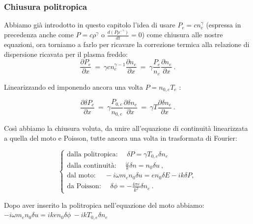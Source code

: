 %
%
\subsubsection{Chiusura politropica} 
Abbiamo già introdotto in questo capitolo l'idea di usare $P_e=cn_e^\gamma$ (espressa in precedenza anche come $P=c\rho^\gamma$ o $\frac{d(P\rho^{-\gamma})}{dt}=0$) come chiusura alle nostre equazioni, ora torniamo a farlo per ricavare la correzione termica alla relazione di dispersione ricavata per il plasma freddo:
\[\frac{\partial P_e}{\partial x}\ =\ \gamma cn_e^{\gamma-1}\frac{\partial n_e}{\partial x}\ =\ \gamma \frac{P_e}{n_e}\frac{\partial n_e}{\partial x}\ .\] 

Linearizzando ed imponendo ancora una volta $P=n_{0,e}T_e$ :

\[\frac{\partial \delta P_e}{\partial x}\ =\ \gamma \frac{P_{0,e}}{n_{0,e}}\frac{\partial\delta n_e}{\partial x}\ =\ \gamma T \frac{\partial \delta n_e}{\partial x}\ .\]  

Così abbiamo la chiusura voluta, da unire all'equazione di continuità linearizzata a quella del moto e Poisson, tutte ancora una volta in trasformata di Fourier:

\[\begin{cases}
	\text{dalla politropica: }\quad\delta P=\gamma T_{0,e}\delta n_e \\
	\text{dalla continuità: }\quad\displaystyle\frac{\omega}{k}\delta n = n_0\delta u\ ,\\
	\text{dal moto: }\quad-i\omega m_en_0\delta u= en_0\delta E - ik\delta P , \\
	\text{da Poisson: }\quad\delta \phi =-\displaystyle\frac{4\pi e}{k^2}\delta n_e\ .
\end{cases}\]

Dopo aver inserito la politropica nell'equazione del moto abbiamo: $-i\omega m_en_0\delta u= iken_0\delta \phi\ - ik T_{0,e} \delta n_e$

